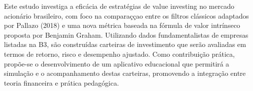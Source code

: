 \begin{meuresumo}
Este estudo investiga a eficácia de estratégias de value investing no mercado acionário brasileiro, com foco na comparaççao entre os filtros clássicos adaptados por Pallazo (2018) e uma nova métrica baseada na fórmula de valor intrínseco proposta por Benjamin Graham. Utilizando dados fundamentalistas de empresas listadas na B3, são construídas carteiras de investimento que serão avaliadas em termos de retorno, risco e desempenho ajustado. Como contribuição prática, propõe-se o desenvolvimento de um aplicativo educacional que permitirá a simulação e o acompanhamento destas carteiras, promovendo a integração entre teoria financeira e prática pedagógica. 
\end{meuresumo}




\makeatletter
\def\@makechapterhead#1{%
  \vspace*{50\p@}%
  {\parindent \z@ \raggedright \normalfont
    \ifnum \c@secnumdepth >\m@ne
      \huge\bfseries \thechapter\space
    \fi
    \huge \bfseries #1\par\nobreak
    \vskip 40\p@
  }}
\makeatother


